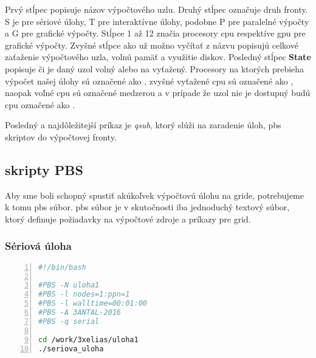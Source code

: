 Prvý stĺpec popisuje názov výpočtového uzlu. Druhý stĺpec označuje druh fronty. S je pre sériové úlohy, T pre interaktívne úlohy, podobne P pre paralelné výpočty
a G pre grafické výpočty. Stĺpce 1 až 12 značia procesory \acrshort{cpu} respektíve \acrshort{gpu} pre grafické výpočty.
Zvyšné stĺpce ako už možno vyčítať z názvu popisujú celkové zaťaženie výpočtového uzla, volnú pamäť a využitie diskov.
Posledný stĺpec \textbf{State} popisuje či je daný uzol volný alebo na vyťažený.
Procesory na ktorých prebieha výpočet našej úlohy sú označené ako \textquote{[O]}, zvyšné vyťažené \acrshort{cpu} sú označené ako \textquote{[X]},
naopak voľné \acrshort{cpu} sú označené medzerou \textquote{[ ]} a v prípade že uzol nie je dostupný budú \acrshort{cpu} označené ako \textquote{[-]}.

Posledný a najdôležitejší príkaz je \textit{qsub}, ktorý slúži na zaradenie úloh, \acrshort{pbs} skriptov do výpočtovej fronty.

\subsection{skripty PBS}
Aby sme boli schopný spustiť akúkoľvek výpočtovú úlohu na gride, potrebujeme k tomu \acrfull{pbs} súbor.
\acrshort{pbs} súbor je v skutočnosti iba jednoduchý textový súbor, ktorý definuje požiadavky na výpočtové zdroje a príkazy pre grid.

\subsubsection{Sériová úloha}

\begin{lstlisting}[language=bash, caption={uloha1.pbs}, label={pbs:1}, numbers=left]
#!/bin/bash

#PBS -N uloha1
#PBS -l nodes=1:ppn=1
#PBS -l walltime=00:01:00  
#PBS -A 3ANTAL-2016
#PBS -q serial

cd /work/3xelias/uloha1
./seriova_uloha
\end{lstlisting}

